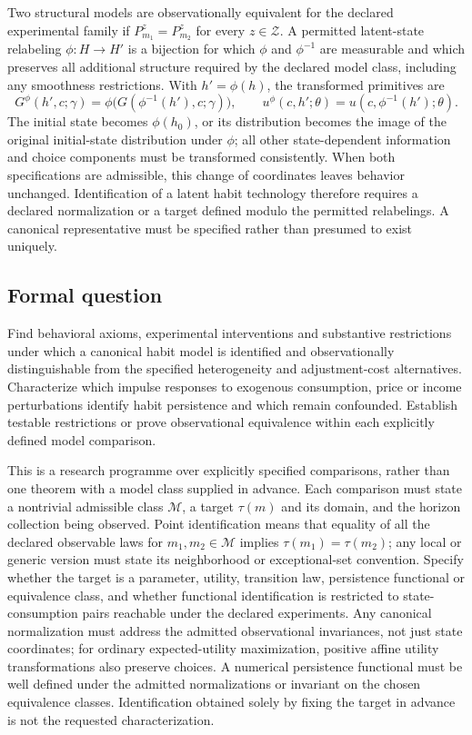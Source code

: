 \documentclass[11pt,a4paper]{article}
\begin{document}
Two structural models are observationally equivalent for the declared experimental family if $P_{m_1}^z=P_{m_2}^z$ for every $z\in\mathcal Z$. A permitted latent-state relabeling $\phi:H\to H'$ is a bijection for which $\phi$ and $\phi^{-1}$ are measurable and which preserves all additional structure required by the declared model class, including any smoothness restrictions. With $h'=\phi(h)$, the transformed primitives are
\[
 G^\phi(h',c;\gamma)=\phi\bigl(G(\phi^{-1}(h'),c;\gamma)\bigr),\qquad
 u^\phi(c,h';\theta)=u(c,\phi^{-1}(h');\theta).
\]
The initial state becomes $\phi(h_0)$, or its distribution becomes the image of the original initial-state distribution under $\phi$; all other state-dependent information and choice components must be transformed consistently. When both specifications are admissible, this change of coordinates leaves behavior unchanged. Identification of a latent habit technology therefore requires a declared normalization or a target defined modulo the permitted relabelings. A canonical representative must be specified rather than presumed to exist uniquely.
\subsection*{Formal question}
Find behavioral axioms, experimental interventions and substantive restrictions under which a canonical habit model is identified and observationally distinguishable from the specified heterogeneity and adjustment-cost alternatives. Characterize which impulse responses to exogenous consumption, price or income perturbations identify habit persistence and which remain confounded. Establish testable restrictions or prove observational equivalence within each explicitly defined model comparison.

This is a research programme over explicitly specified comparisons, rather than one theorem with a model class supplied in advance. Each comparison must state a nontrivial admissible class $\mathcal M$, a target $\tau(m)$ and its domain, and the horizon collection being observed. Point identification means that equality of all the declared observable laws for $m_1,m_2\in\mathcal M$ implies $\tau(m_1)=\tau(m_2)$; any local or generic version must state its neighborhood or exceptional-set convention. Specify whether the target is a parameter, utility, transition law, persistence functional or equivalence class, and whether functional identification is restricted to state-consumption pairs reachable under the declared experiments. Any canonical normalization must address the admitted observational invariances, not just state coordinates; for ordinary expected-utility maximization, positive affine utility transformations also preserve choices. A numerical persistence functional must be well defined under the admitted normalizations or invariant on the chosen equivalence classes. Identification obtained solely by fixing the target in advance is not the requested characterization.
\end{document}
